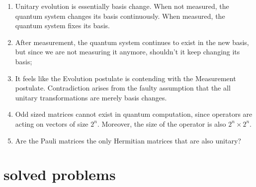 \documentclass[14pt]{extarticle}
\begin{document}
\begin{enumerate}
      \item Unitary evolution is essentially basis change. When not measured, the quantum system changes its basis continuously. When measured, the quantum system fixes its basis. 

      \item After measurement, the quantum system continues to exist in the new basis, but since we are not measuring it anymore, shouldn't it keep changing its basis; 

      \item It feels like the Evolution postulate is contending with the Measurement postulate. Contradiction arises from the faulty assumption that the all unitary transformations are merely basis changes.


      \item Odd sized matrices cannot exist in quantum computation, since operators are acting on vectors of size $2^n$. Moreover, the size of the operator is also $2^n \times 2^n$.


      \item Are the Pauli matrices the only Hermitian matrices that are also unitary?
\end{enumerate}


\section{solved problems}
\end{document}
